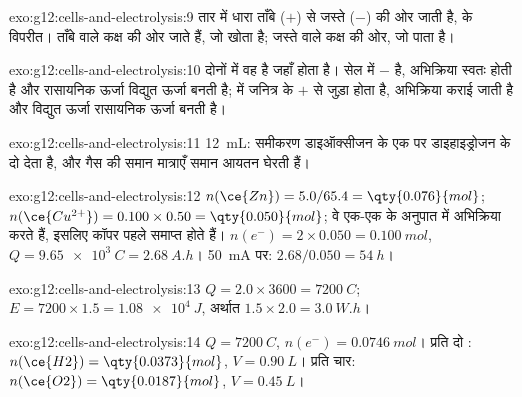 \begin{solution}{exo:g12:cells-and-electrolysis:9}
तार में धारा ताँबे ($+$) से जस्ते ($-$) की ओर जाती है,
 के विपरीत।   ताँबे वाले कक्ष की ओर जाते हैं,
जो  खोता है;   जस्ते वाले
कक्ष की ओर, जो  पाता है।
\end{solution}

\begin{solution}{exo:g12:cells-and-electrolysis:10}
दोनों में  वह है जहाँ  होता है। सेल में 
$-$ है, अभिक्रिया स्वतः होती है और रासायनिक ऊर्जा
विद्युत ऊर्जा बनती है;  में  जनित्र के $+$ से जुड़ा होता है,
अभिक्रिया कराई जाती है और विद्युत ऊर्जा
रासायनिक ऊर्जा बनती है।
\end{solution}

\begin{solution}{exo:g12:cells-and-electrolysis:11}
\qty{12}{mL}: समीकरण  डाइऑक्सीजन के एक  पर
डाइहाइड्रोजन के दो  देता है, और गैस की समान मात्राएँ समान
आयतन घेरती हैं।
\end{solution}

\begin{solution}{exo:g12:cells-and-electrolysis:12}
$n(\ce{Zn}) = 5.0/65.4 = \qty{0.076}{mol}$;
$n(\ce{Cu^{2+}}) = 0.100 \times 0.50 = \qty{0.050}{mol}$; वे एक-एक के
अनुपात में अभिक्रिया करते हैं, इसलिए कॉपर  पहले समाप्त होते हैं। $n(e^-) = 2 \times 0.050
= \qty{0.100}{mol}$, $Q = \qty{9.65e3}{C} = \qty{2.68}{A.h}$।
\qty{50}{mA} पर: $2.68/0.050 = \qty{54}{h}$।
\end{solution}

\begin{solution}{exo:g12:cells-and-electrolysis:13}
$Q = 2.0 \times 3600 = \qty{7200}{C}$; $E = 7200 \times 1.5 =
\qty{1.08e4}{J}$, अर्थात $1.5 \times 2.0 = \qty{3.0}{W.h}$।
\end{solution}

\begin{solution}{exo:g12:cells-and-electrolysis:14}
$Q = \qty{7200}{C}$, $n(e^-) = \qty{0.0746}{mol}$। प्रति
 दो : $n(\ce{H2}) = \qty{0.0373}{mol}$, $V = \qty{0.90}{L}$। प्रति
 चार: $n(\ce{O2}) = \qty{0.0187}{mol}$, $V = \qty{0.45}{L}$।
\end{solution}

